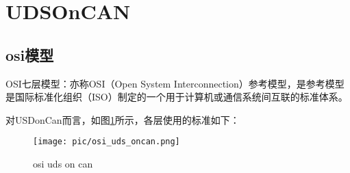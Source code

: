 \section{UDSOnCAN}
\subsection{osi模型}
OSI七层模型：亦称OSI（Open System Interconnection）参考模型，是参考模型是国际标准化组织（ISO）制定的一个用于计算机或通信系统间互联的标准体系。

对USDonCan而言，如图\ref{fig:usd_oncan}所示，各层使用的标准如下：
\begin{figure}[ht]
    \centering
    \texttt{[image: pic/osi\_uds\_oncan.png]}
    \caption{osi uds on can}
    \label{fig:usd_oncan}
\end{figure}
